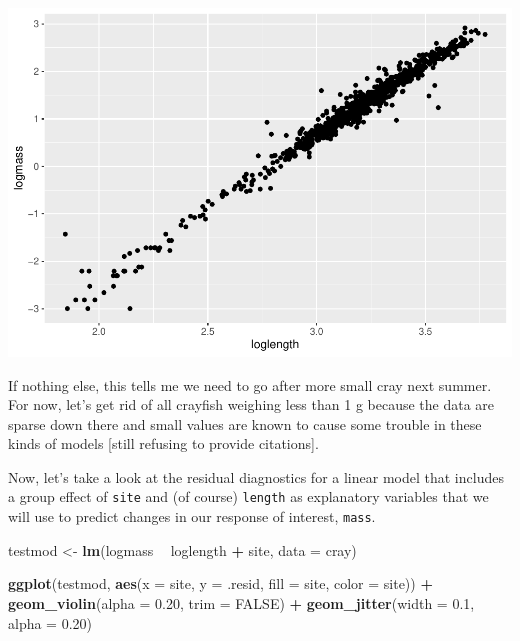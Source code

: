 \documentclass[
]{book}
\newenvironment{Shaded}{\begin{snugshade}}{\end{snugshade}}
\newcommand{\CommentTok}[1]{\textcolor[rgb]{0.56,0.35,0.01}{\textit{#1}}}
\newcommand{\DataTypeTok}[1]{\textcolor[rgb]{0.13,0.29,0.53}{#1}}
\newcommand{\DecValTok}[1]{\textcolor[rgb]{0.00,0.00,0.81}{#1}}
\newcommand{\FloatTok}[1]{\textcolor[rgb]{0.00,0.00,0.81}{#1}}
\newcommand{\KeywordTok}[1]{\textcolor[rgb]{0.13,0.29,0.53}{\textbf{#1}}}
\newcommand{\NormalTok}[1]{#1}
\newcommand{\OperatorTok}[1]{\textcolor[rgb]{0.81,0.36,0.00}{\textbf{#1}}}
\newcommand{\OtherTok}[1]{\textcolor[rgb]{0.56,0.35,0.01}{#1}}
\newcommand{\StringTok}[1]{\textcolor[rgb]{0.31,0.60,0.02}{#1}}
\begin{document}
\includegraphics{worstr_files/figure-latex/unnamed-chunk-373-1.pdf}

If nothing else, this tells me we need to go after more small cray next summer. For now, let's get rid of all crayfish weighing less than 1 g because the data are sparse down there and small values are known to cause some trouble in these kinds of models {[}still refusing to provide citations{]}.

\begin{Shaded}
\end{Shaded}

Now, let's take a look at the residual diagnostics for a linear model that includes a group effect of \texttt{site} and (of course) \texttt{length} as explanatory variables that we will use to predict changes in our response of interest, \texttt{mass}.

\begin{Shaded}
\begin{Highlighting}[]
\NormalTok{testmod <-}\StringTok{ }\KeywordTok{lm}\NormalTok{(logmass }\OperatorTok{~}\StringTok{ }\NormalTok{loglength }\OperatorTok{+}\StringTok{ }\NormalTok{site, }\DataTypeTok{data =}\NormalTok{ cray)}

\KeywordTok{ggplot}\NormalTok{(testmod, }\KeywordTok{aes}\NormalTok{(}\DataTypeTok{x =}\NormalTok{ site, }\DataTypeTok{y =}\NormalTok{ .resid, }\DataTypeTok{fill =}\NormalTok{ site, }\DataTypeTok{color =}\NormalTok{ site)) }\OperatorTok{+}
\StringTok{  }\KeywordTok{geom_violin}\NormalTok{(}\DataTypeTok{alpha =} \FloatTok{0.20}\NormalTok{, }\DataTypeTok{trim =} \OtherTok{FALSE}\NormalTok{) }\OperatorTok{+}
\StringTok{  }\KeywordTok{geom_jitter}\NormalTok{(}\DataTypeTok{width =} \FloatTok{0.1}\NormalTok{, }\DataTypeTok{alpha =} \FloatTok{0.20}\NormalTok{)}
\end{Highlighting}
\end{Shaded}
\end{document}
